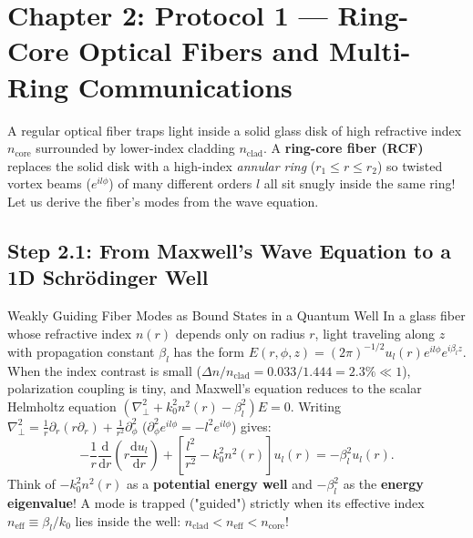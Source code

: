 \documentclass[10pt,letterpaper]{article}
\newcommand{\dd}{\mathrm{d}}
\numberwithin{equation}{section}
\begin{document}
\section{Chapter 2: Protocol 1 --- Ring-Core Optical Fibers and Multi-Ring Communications}
\label{sec:b_c2}

\begin{whystep}
A regular optical fiber traps light inside a solid glass disk of high refractive index $n_{\mathrm{core}}$ surrounded by lower-index cladding $n_{\mathrm{clad}}$. A \textbf{ring-core fiber (RCF)} replaces the solid disk with a high-index \emph{annular ring} ($r_1 \le r \le r_2$) so twisted vortex beams ($e^{il\phi}$) of many different orders $l$ all sit snugly inside the same ring! Let us derive the fiber's modes from the wave equation.
\end{whystep}

\subsection{Step 2.1: From Maxwell's Wave Equation to a 1D Schr\"odinger Well}

\begin{foundationbox}{Weakly Guiding Fiber Modes as Bound States in a Quantum Well}
In a glass fiber whose refractive index $n(r)$ depends only on radius $r$, light traveling along $z$ with propagation constant $\beta_l$ has the form $E(r,\phi,z) = (2\pi)^{-1/2} u_l(r) e^{il\phi} e^{i\beta_l z}$. When the index contrast is small ($\Delta n/n_{\mathrm{clad}} = 0.033/1.444 = 2.3\% \ll 1$), polarization coupling is tiny, and Maxwell's equation reduces to the scalar Helmholtz equation $(\nabla_\perp^2 + k_0^2 n^2(r) - \beta_l^2) E = 0$. Writing $\nabla_\perp^2 = \frac{1}{r}\partial_r(r\partial_r) + \frac{1}{r^2}\partial_\phi^2$ ($\partial_\phi^2 e^{il\phi} = -l^2 e^{il\phi}$) gives:
\[
  -\frac{1}{r}\frac{\dd}{\dd r}\!\left(r\frac{\dd u_l}{\dd r}\right) + \left[\frac{l^2}{r^2} - k_0^2 n^2(r)\right] u_l(r) = -\beta_l^2 u_l(r).
\]
Think of $-k_0^2 n^2(r)$ as a \textbf{potential energy well} and $-\beta_l^2$ as the \textbf{energy eigenvalue}! A mode is trapped ("guided") strictly when its effective index $n_{\mathrm{eff}} \equiv \beta_l/k_0$ lies inside the well: $n_{\mathrm{clad}} < n_{\mathrm{eff}} < n_{\mathrm{core}}$!
\end{foundationbox}
\end{document}
